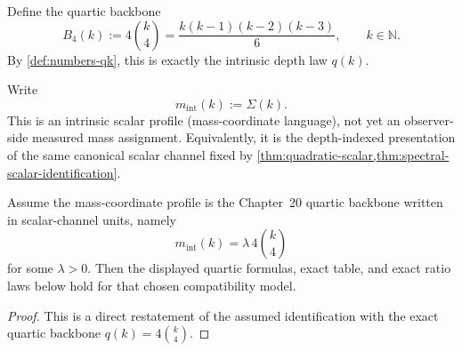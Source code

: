 Define the quartic backbone
\[
  B_4(k):=4\binom{k}{4}
  =
  \frac{k(k-1)(k-2)(k-3)}{6},
  \qquad
  k\in\mathbb N.
\]
By \cref{def:numbers-qk}, this is exactly the intrinsic depth law
\(q(k)\).

\begin{definition}
\label{def:intrinsic-mass-coordinate-profile}
Write
\[
  m_{\mathrm{int}}(k):=\Sigma(k).
\]
This is an intrinsic scalar profile (mass-coordinate language), not yet an
observer-side measured mass assignment.
Equivalently, it is the depth-indexed presentation of the same canonical
scalar channel fixed by
\cref{thm:quadratic-scalar,thm:spectral-scalar-identification}.
\end{definition}

\begin{theorem}
\label{thm:intrinsic-spectral-mass-law}
Assume the mass-coordinate profile is the Chapter~20 quartic backbone
written in scalar-channel units, namely
\[
  m_{\mathrm{int}}(k)=\lambda\,4\binom{k}{4}
\]
for some \(\lambda>0\).
Then the displayed quartic formulas, exact table, and exact ratio laws
below hold for that chosen compatibility model.
\end{theorem}

\begin{proof}
This is a direct restatement of the assumed identification with the
exact quartic backbone \(q(k)=4\binom{k}{4}\).
\end{proof}

